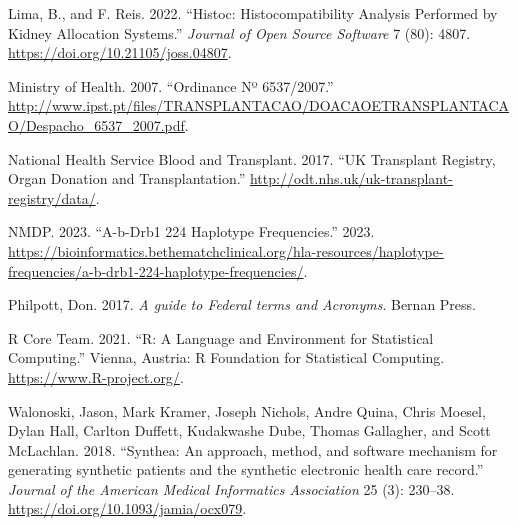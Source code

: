 \documentclass[
]{article}
\newlength{\cslhangindent}
\newlength{\cslentryspacingunit} %
\newenvironment{CSLReferences}[2] %
 {%
  \setlength{\parindent}{0pt}
  \ifodd #1
  \let\oldpar\par
  \def\par{\hangindent=\cslhangindent\oldpar}
  \fi
  \setlength{\parskip}{#2\cslentryspacingunit}
 }%
 {}
\begin{document}
\begin{CSLReferences}{1}{0}
\leavevmode{}%
Lima, B., and F. Reis. 2022. {``Histoc: Histocompatibility Analysis
Performed by Kidney Allocation Systems.''} \emph{Journal of Open Source
Software} 7 (80): 4807. \url{https://doi.org/10.21105/joss.04807}.

\leavevmode{}%
Ministry of Health. 2007. {``Ordinance Nº 6537/2007.''}
\url{http://www.ipst.pt/files/TRANSPLANTACAO/DOACAOETRANSPLANTACAO/Despacho_6537_2007.pdf}.

\leavevmode{}%
National Health Service Blood and Transplant. 2017. {``{UK Transplant
Registry, Organ Donation and Transplantation}.''}
\url{http://odt.nhs.uk/uk-transplant-registry/data/}.

\leavevmode{}%
NMDP. 2023. {``A-b-Drb1 224 Haplotype Frequencies.''} 2023.
\url{https://bioinformatics.bethematchclinical.org/hla-resources/haplotype-frequencies/a-b-drb1-224-haplotype-frequencies/}.

\leavevmode{}%
Philpott, Don. 2017. \emph{{A guide to Federal terms and Acronyms}}.
Bernan Press.

\leavevmode{}%
R Core Team. 2021. {``R: A Language and Environment for Statistical
Computing.''} Vienna, Austria: R Foundation for Statistical Computing.
\url{https://www.R-project.org/}.

\leavevmode{}%
Walonoski, Jason, Mark Kramer, Joseph Nichols, Andre Quina, Chris
Moesel, Dylan Hall, Carlton Duffett, Kudakwashe Dube, Thomas Gallagher,
and Scott McLachlan. 2018. {``{Synthea: An approach, method, and
software mechanism for generating synthetic patients and the synthetic
electronic health care record}.''} \emph{Journal of the American Medical
Informatics Association} 25 (3): 230--38.
\url{https://doi.org/10.1093/jamia/ocx079}.

\end{CSLReferences}
\end{document}
